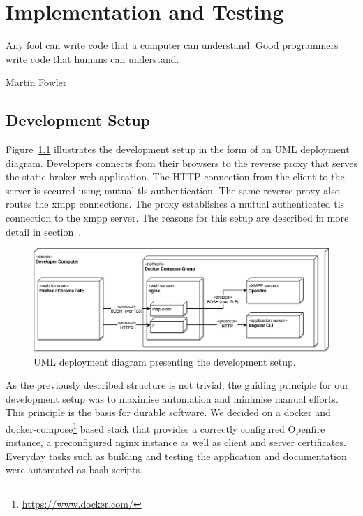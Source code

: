 \chapter{Implementation and Testing} %
\epigraph{Any fool can write code that a computer can understand. Good programmers write code that humans can understand.}{Martin Fowler}


\section{Development Setup}\label{sec:development-setup}

Figure~\ref{fig:development-setup} illustrates the development setup in the form of an UML deployment diagram.
Developers connects from their browsers to the reverse proxy that serves the static \gls{broker} web application.
The HTTP connection from the client to the server is secured using mutual \gls{tls} authentication.
The same reverse proxy also routes the \gls{xmpp} connections.
The proxy establishes a mutual authenticated \gls{tls} connection to the \gls{xmpp} server.
The reasons for this setup are described in more detail in section~.

\begin{figure}[h]
    \centering
    \includegraphics[width=1\linewidth]{resources/development-setup-uml}
    \caption{UML deployment diagram presenting the development setup.}
    \label{fig:development-setup}
\end{figure}

As the previously described structure is not trivial, the guiding principle for our development setup was to maximise automation and minimise manual efforts.
This principle is the basis for durable software.
We decided on a docker and docker-compose\footnote{\url{https://www.docker.com/}} based stack that provides a correctly configured Openfire instance, a preconfigured nginx instance as well as client and server certificates.
Everyday tasks such as building and testing the application and documentation were automated as bash scripts.


